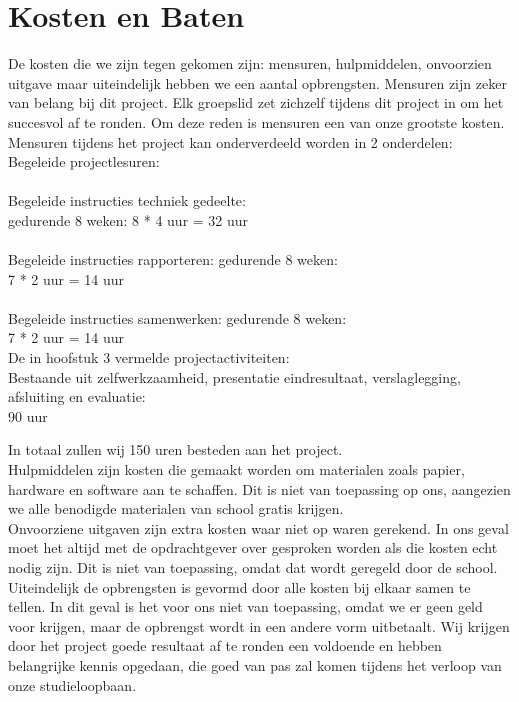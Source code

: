 \documentclass[oneside]{book}
\begin{document}
\clearpage
\chapter{Kosten en Baten}
De kosten die we zijn tegen gekomen zijn: mensuren, hulpmiddelen, onvoorzien uitgave maar uiteindelijk hebben we een aantal opbrengsten.
Mensuren zijn zeker van belang bij dit project. Elk groepslid zet zichzelf tijdens dit project in om het succesvol af te ronden. Om deze reden is mensuren een van onze grootste kosten. \\

Mensuren tijdens het project kan onderverdeeld worden in 2 onderdelen:
Begeleide projectlesuren: \\
\\
Begeleide instructies techniek gedeelte: \\ 
gedurende 8 weken:  8 * 4  uur  =  32 uur\\
\\
Begeleide instructies rapporteren:  gedurende 8 weken:\\
7 * 2  uur   =  14 uur\\
\\
Begeleide instructies samenwerken:  gedurende 8 weken:\\
7 * 2  uur  =  14  uur\\
                                                      
De in hoofstuk 3 vermelde projectactiviteiten:\\ 
Bestaande uit zelfwerkzaamheid, presentatie eindresultaat, verslaglegging, afsluiting en evaluatie: \\90 uur

In totaal zullen wij 150 uren besteden aan het project.\\

Hulpmiddelen zijn kosten die gemaakt worden om materialen zoals papier, 
hardware en software aan te schaffen. Dit is niet van toepassing op ons, aangezien
we alle benodigde materialen van school gratis krijgen.\\

Onvoorziene uitgaven zijn extra kosten waar niet op waren gerekend. In ons geval
moet het altijd met de opdrachtgever over gesproken worden als die kosten echt
nodig zijn. Dit is niet van toepassing, omdat dat wordt geregeld door de school.\\

Uiteindelijk de opbrengsten is gevormd door alle kosten bij elkaar
samen te tellen. In dit geval is het voor ons niet van toepassing, omdat
we er geen geld voor krijgen, maar de opbrengst wordt in een andere vorm uitbetaalt. 
Wij krijgen door het project goede resultaat af te ronden een voldoende en hebben belangrijke    
kennis   opgedaan, die goed van pas zal komen tijdens het verloop van onze studieloopbaan.
\clearpage
\end{document}
